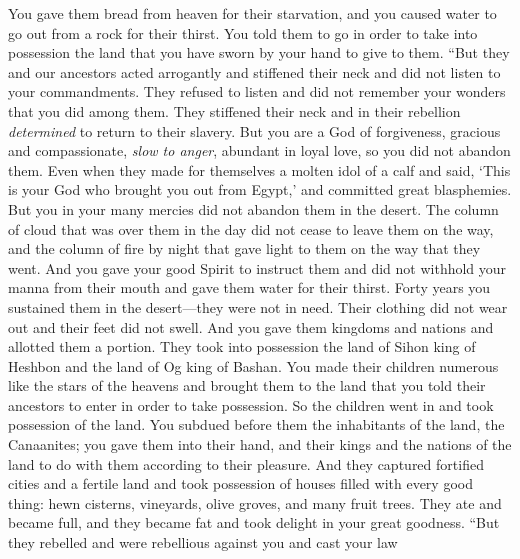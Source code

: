 \begin{biblechapter}
{{{{{{\verse You gave them bread from heaven for their starvation, and you caused water to go out from a rock for their thirst. You told them to go in order to take into possession the land that you have sworn by your hand to give to them.
\verse “But they and our ancestors acted arrogantly and stiffened their neck and did not listen to your commandments.
\verse They refused to listen and did not remember your wonders that you did among them. They stiffened their neck and in their rebellion \textit{determined} to return to their slavery. But you are a God of forgiveness, gracious and compassionate, \textit{slow to anger}, abundant in loyal love, so you did not abandon them.
\verse Even when they made for themselves a molten idol of a calf and said, ‘This is your God who brought you out from Egypt,’ and committed great blasphemies.
\verse But you in your many mercies did not abandon them in the desert. The column of cloud that was over them in the day did not cease to leave them on the way, and the column of fire by night that gave light to them on the way that they went.
\verse And you gave your good Spirit to instruct them and did not withhold your manna from their mouth and gave them water for their thirst.
\verse Forty years you sustained them in the desert—they were not in need. Their clothing did not wear out and their feet did not swell.
\verse And you gave them kingdoms and nations and allotted them a portion. They took into possession the land of Sihon king of Heshbon and the land of Og king of Bashan.
\verse You made their children numerous like the stars of the heavens and brought them to the land that you told their ancestors to enter in order to take possession.
\verse So the children went in and took possession of the land. You subdued before them the inhabitants of the land, the Canaanites; you gave them into their hand, and their kings and the nations of the land to do with them according to their pleasure.
\verse And they captured fortified cities and a fertile land and took possession of houses filled with every good thing: hewn cisterns, vineyards, olive groves, and many fruit trees. They ate and became full, and they became fat and took delight in your great goodness.
\verse “But they rebelled and were rebellious against you and cast your law}}}}}}
\end{biblechapter}
